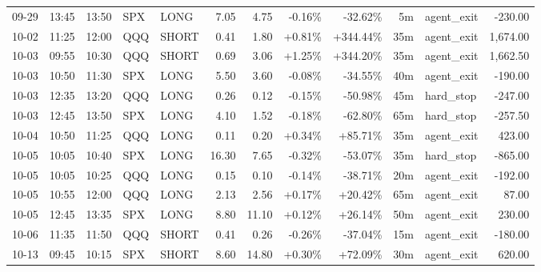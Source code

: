 \documentclass[11pt,a4paper,twoside]{article}
\begin{document}
\begin{center}
\begin{longtable}{>{\color{txtmain}}l l l l l r r r r r >{\color{txtmain}}l r}
09-29 & 13:45 & 13:50 & SPX & LONG & 7.05 & 4.75 & \textcolor{lossred}{-0.16\%} & \textcolor{lossred}{-32.62\%} & 5m & agent\_exit & \textcolor{lossred}{-230.00} \\
10-02 & 11:25 & 12:00 & QQQ & SHORT & 0.41 & 1.80 & \textcolor{wingreen}{+0.81\%} & \textcolor{wingreen}{+344.44\%} & 35m & agent\_exit & \textcolor{wingreen}{1,674.00} \\
10-03 & 09:55 & 10:30 & QQQ & SHORT & 0.69 & 3.06 & \textcolor{wingreen}{+1.25\%} & \textcolor{wingreen}{+344.20\%} & 35m & agent\_exit & \textcolor{wingreen}{1,662.50} \\
10-03 & 10:50 & 11:30 & SPX & LONG & 5.50 & 3.60 & \textcolor{lossred}{-0.08\%} & \textcolor{lossred}{-34.55\%} & 40m & agent\_exit & \textcolor{lossred}{-190.00} \\
10-03 & 12:35 & 13:20 & QQQ & LONG & 0.26 & 0.12 & \textcolor{lossred}{-0.15\%} & \textcolor{lossred}{-50.98\%} & 45m & hard\_stop & \textcolor{lossred}{-247.00} \\
10-03 & 12:45 & 13:50 & SPX & LONG & 4.10 & 1.52 & \textcolor{lossred}{-0.18\%} & \textcolor{lossred}{-62.80\%} & 65m & hard\_stop & \textcolor{lossred}{-257.50} \\
10-04 & 10:50 & 11:25 & QQQ & LONG & 0.11 & 0.20 & \textcolor{wingreen}{+0.34\%} & \textcolor{wingreen}{+85.71\%} & 35m & agent\_exit & \textcolor{wingreen}{423.00} \\
10-05 & 10:05 & 10:40 & SPX & LONG & 16.30 & 7.65 & \textcolor{lossred}{-0.32\%} & \textcolor{lossred}{-53.07\%} & 35m & hard\_stop & \textcolor{lossred}{-865.00} \\
10-05 & 10:05 & 10:25 & QQQ & LONG & 0.15 & 0.10 & \textcolor{lossred}{-0.14\%} & \textcolor{lossred}{-38.71\%} & 20m & agent\_exit & \textcolor{lossred}{-192.00} \\
10-05 & 10:55 & 12:00 & QQQ & LONG & 2.13 & 2.56 & \textcolor{wingreen}{+0.17\%} & \textcolor{wingreen}{+20.42\%} & 65m & agent\_exit & \textcolor{wingreen}{87.00} \\
10-05 & 12:45 & 13:35 & SPX & LONG & 8.80 & 11.10 & \textcolor{wingreen}{+0.12\%} & \textcolor{wingreen}{+26.14\%} & 50m & agent\_exit & \textcolor{wingreen}{230.00} \\
10-06 & 11:35 & 11:50 & QQQ & SHORT & 0.41 & 0.26 & \textcolor{lossred}{-0.26\%} & \textcolor{lossred}{-37.04\%} & 15m & agent\_exit & \textcolor{lossred}{-180.00} \\
10-13 & 09:45 & 10:15 & SPX & SHORT & 8.60 & 14.80 & \textcolor{wingreen}{+0.30\%} & \textcolor{wingreen}{+72.09\%} & 30m & agent\_exit & \textcolor{wingreen}{620.00} \\

\end{longtable}
\end{center}
\end{document}
